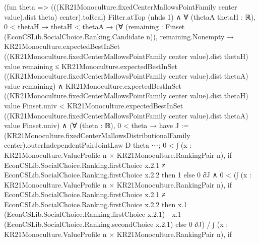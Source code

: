 \documentclass[10pt]{article}
\begin{document}
\begin{ReviewVerbatim}
                      (fun theta =>
                        (((KR21Monoculture.fixedCenterMallowsPointFamily center value).dist theta) center).toReal)
                      Filter.atTop (nhds 1) ∧
                    ∀ (thetaA thetaH : ℝ),
                      0 < thetaH →
                        thetaH < thetaA →
                          (∀ (remaining : Finset (EconCSLib.SocialChoice.Ranking.Candidate n)),
                              remaining.Nonempty →
                                KR21Monoculture.expectedBestInSet
                                    ((KR21Monoculture.fixedCenterMallowsPointFamily center value).dist thetaH) value
                                    remaining ≤
                                  KR21Monoculture.expectedBestInSet
                                    ((KR21Monoculture.fixedCenterMallowsPointFamily center value).dist thetaA) value
                                    remaining) ∧
                            KR21Monoculture.expectedBestInSet
                                ((KR21Monoculture.fixedCenterMallowsPointFamily center value).dist thetaH) value
                                Finset.univ <
                              KR21Monoculture.expectedBestInSet
                                ((KR21Monoculture.fixedCenterMallowsPointFamily center value).dist thetaA) value
                                Finset.univ) ∧
            (∀ (theta : ℝ),
                0 < theta →
                  have J :=
                    (KR21Monoculture.fixedCenterMallowsDistributionalFamily center).outerIndependentPairJointLaw D theta
                      ⋯;
                  0 <
                      ∫ (x : KR21Monoculture.ValueProfile n × KR21Monoculture.RankingPair n),
                        if
                            EconCSLib.SocialChoice.Ranking.firstChoice x.2.1 ≠
                              EconCSLib.SocialChoice.Ranking.firstChoice x.2.2 then
                          1
                        else 0 ∂J ∧
                    0 <
                      (∫ (x : KR21Monoculture.ValueProfile n × KR21Monoculture.RankingPair n),
                          if
                              EconCSLib.SocialChoice.Ranking.firstChoice x.2.1 ≠
                                EconCSLib.SocialChoice.Ranking.firstChoice x.2.2 then
                            x.1 (EconCSLib.SocialChoice.Ranking.firstChoice x.2.1) -
                              x.1 (EconCSLib.SocialChoice.Ranking.secondChoice x.2.1)
                          else 0 ∂J) /
                        ∫ (x : KR21Monoculture.ValueProfile n × KR21Monoculture.RankingPair n),
                          if

\end{ReviewVerbatim}
\end{document}
